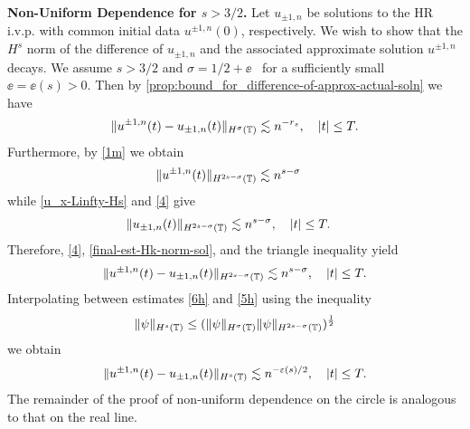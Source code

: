 \textbf{Non-Uniform Dependence for $s > 3/2$.}
%
%
%
Let $u_{\pm 1, n}$ be solutions to the HR i.v.p. with common initial data 
$u^{\pm 1,
n}(0)$, respectively.
We wish to show that the $H^s$ norm of the difference of $u_{\pm 1,
n}$ and the associated approximate solution $u^{\pm 1, n}$ decays.
We assume
$s > 3/2 $ and $\sigma = 1/2 + \ee$ \ for a sufficiently small
$\ee= \ee(s) > 0$. 
Then by \cref{prop:bound_for_difference-of-approx-actual-soln} we 
have
%
%
\begin{equation}
\begin{split}
\|u^{\pm 1, n}(t) - u_{\pm 1, n} (t) \|_{H^\sigma (\mathbb{T})} \lesssim n^{-r_s}
\label{6h}, \quad |t| \le T.
\end{split}
\end{equation}
%
%
Furthermore, by \eqref{1m} we obtain
%
%
\begin{equation}
\begin{split}
\|u^{\pm 1, n} (t) \|_{H^{2s - \sigma} (\mathbb{T})}
& \lesssim n^{s-\sigma}
\label{4}
\end{split}
\end{equation}
%
%
while \eqref{u_x-Linfty-Hs} and \eqref{4} give
\begin{equation}
	\begin{split}
\|u_{\pm 1, n} (t) \|_{H^{2s - \sigma}(\mathbb{T})}
& \lesssim n^{s- \sigma}, \quad |t| \le T.
\label{final-est-Hk-norm-sol}
\end{split}
\end{equation}
%
%
%
%
%
%
%
Therefore, \eqref{4}, \eqref{final-est-Hk-norm-sol}, and the triangle
inequality yield
%
%
\begin{equation}
\begin{split}
\|u^{\pm 1, n} (t) - u_{\pm 1, n}(t)\|_{H^{2s - \sigma}(\mathbb{T})}
\lesssim n^{s-\sigma}, \quad |t| \le T.
\label{5h}
\end{split}
\end{equation}
%
%
%
%
Interpolating between estimates \eqref{6h} and \eqref{5h} using the 
inequality
%
\begin{equation*}
\|\psi \|_{H^s (\mathbb{T})} \leq  (\| \psi \|_{H^\sigma (\mathbb{T})} \| \psi
\|_{H^{2s-\sigma}(\mathbb{T})})^\frac12
\end{equation*}
%
%
we obtain
%
%
\begin{equation}
\begin{split}
\|u^{\pm 1,n}(t) - u_{\pm 1, n}(t) \|_{H^s (\mathbb{T})} \lesssim
n^{-\varepsilon(s)/2}, \quad |t| \le T.
\label{10h}
\end{split}
\end{equation}
%
%
The remainder of the proof of non-uniform dependence on the circle is
analogous to that on the real line. \qquad \qedsymbol
%
%
%
%
%
%
%
%
%
